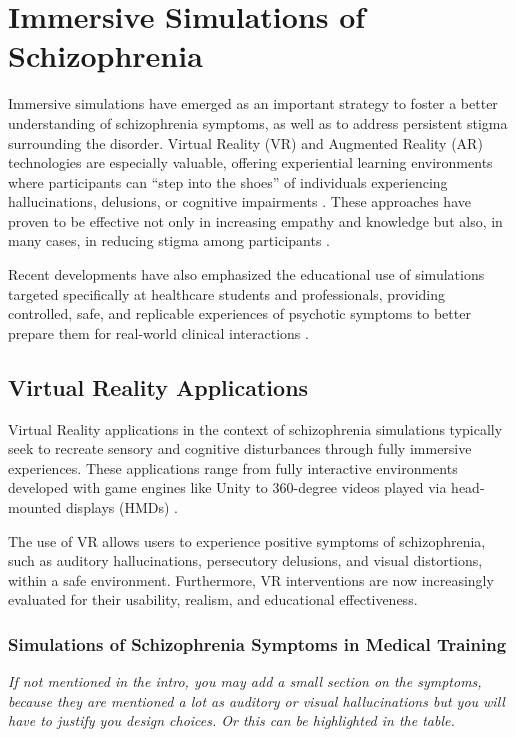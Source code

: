 \section{Immersive Simulations of Schizophrenia}
Immersive simulations have emerged as an important strategy to foster a better understanding of schizophrenia symptoms, as well as to address persistent stigma surrounding the disorder. Virtual Reality (VR) and Augmented Reality (AR) technologies are especially valuable, offering experiential learning environments where participants can “step into the shoes” of individuals experiencing hallucinations, delusions, or cognitive impairments \cite{Krogmeier2024}. These approaches have proven to be effective not only in increasing empathy and knowledge but also, in many cases, in reducing stigma among participants \cite{Krogmeier2024,Holopainen2023}.

Recent developments have also emphasized the educational use of simulations targeted specifically at healthcare students and professionals, providing controlled, safe, and replicable experiences of psychotic symptoms to better prepare them for real-world clinical interactions \cite{Yoo2020,Lee2020}.

\subsection{Virtual Reality Applications}
Virtual Reality applications in the context of schizophrenia simulations typically seek to recreate sensory and cognitive disturbances through fully immersive experiences. These applications range from fully interactive environments developed with game engines like Unity to 360-degree videos played via head-mounted displays (HMDs) \cite{Yoo2020,Lee2020}.

The use of VR allows users to experience positive symptoms of schizophrenia, such as auditory hallucinations, persecutory delusions, and visual distortions, within a safe environment. Furthermore, VR interventions are now increasingly evaluated for their usability, realism, and educational effectiveness.

\subsubsection{Simulations of Schizophrenia Symptoms in Medical Training}

\emph{If not mentioned in the intro, you may add a small section on the symptoms, because they are mentioned a lot as auditory or visual hallucinations but you will have to justify you design choices. Or this can be highlighted in the table.}


